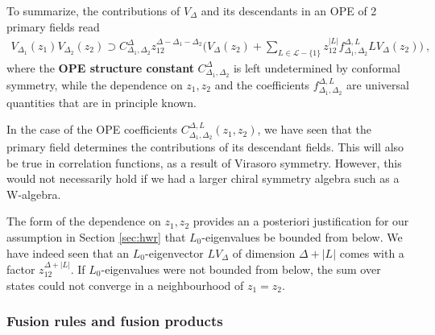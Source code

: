 \documentclass[12pt, a4paper]{article}
\newcommand{\myindex}[1]{\textbf{\boldmath #1}}
\theoremstyle{break}
\begin{document}
To summarize, the contributions of $V_\Delta$ and its descendants in an OPE of 2 primary fields read
\begin{align}
 \boxed{V_{\Delta_1}(z_1)V_{\Delta_2}(z_2) \supset  C_{\Delta_1,\Delta_2}^{\Delta} z_{12}^{\Delta-\Delta_1-\Delta_2} \Bigg(V_\Delta(z_2) +\sum_{L\in \mathcal{L}-\{1\}}z_{12}^{|L|} f^{\Delta,L}_{\Delta_1,\Delta_2} LV_\Delta(z_2)\Bigg)}
 \ ,
 \label{prope}
\end{align}
where the \myindex{OPE structure constant} $C^\Delta_{\Delta_1,\Delta_2}$ is left undetermined by conformal symmetry, while the dependence on $z_1,z_2$ and the coefficients $f^{\Delta,L}_{\Delta_1,\Delta_2}$ are universal quantities that are in principle known. 

In the case of the OPE coefficients $C^{\Delta,L}_{\Delta_1,\Delta_2}(z_1,z_2)$, we have seen that the primary field determines the contributions of its descendant fields. This will also be true in correlation functions, as a result of Virasoro symmetry. However, this would not necessarily hold if we had a larger chiral symmetry algebra such as a W-algebra. 

The form of the dependence on $z_1,z_2$ provides an a posteriori justification for our assumption in Section \ref{sec:hwr} that $L_0$-eigenvalues be bounded from below. We have indeed seen that an $L_0$-eigenvector $LV_\Delta$ of dimension $\Delta+|L|$ comes with a factor $z_{12}^{\Delta+|L|}$. If $L_0$-eigenvalues were not bounded from below, the sum over states could not converge in a neighbourhood of $z_1=z_2$. 


\subsubsection{Fusion rules and fusion products}\label{sec:dope}
\end{document}
